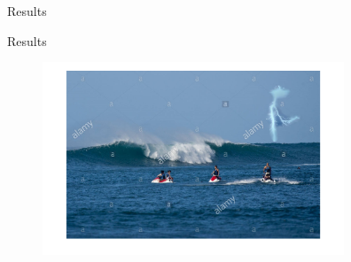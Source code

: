 \documentclass[11pt]{beamer}
\begin{document}
\begin{frame}{Results}
\begin{figure}
\begin{subfigure}[b]{0.3\textwidth}
    \end{subfigure}

\end{figure}
\end{frame}

\begin{frame}{Results}
\begin{figure}
    \centering
    \includegraphics[width=90mm]{Mar_motos_result}
\end{figure}
\end{frame}
\end{document}
